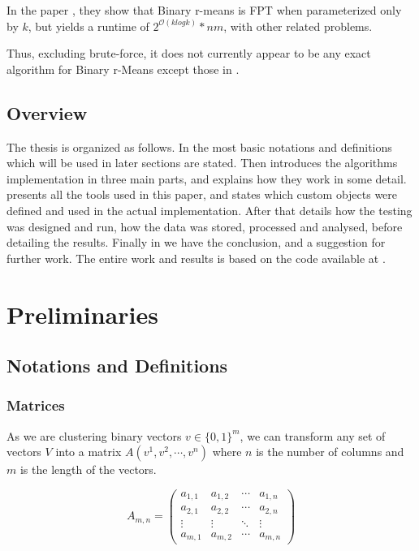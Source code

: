 \documentclass[a4paper]{article}
\begin{document}
In the paper \cite[Theorem 4]{fomin_golovach_panolan_2020}, they show that Binary r-means is FPT
when parameterized only by $k$, but yields a runtime of $2^{\mathcal{O}(k log k)}*nm$, with other related 
problems.

Thus, excluding brute-force, it does not currently appear to be any exact algorithm for 
Binary r-Means except those in \cite{fomin_golovach_panolan_2020}.

\subsection{Overview}
The thesis is organized as follows. In  the most basic notations and definitions which will be used in
later sections are stated. Then  introduces the algorithms implementation in three main parts, and
explains how they work in some detail.  presents all the tools used in this paper, and states which
custom objects were defined and used in the actual implementation. After that  details how the
testing was designed and run, how the data was stored, processed and analysed, before detailing the results. Finally
in  we have the conclusion, and a suggestion for further work. The entire work and results is 
based on the code available at \cite{github:codebase}.

%
%

\newpage

\section{Preliminaries}
\label{sec:prelim}
\subsection{Notations and Definitions}
\subsubsection{Matrices}
As we are clustering binary vectors $v \in \{0,1\}^m$, we can transform any set of vectors
$V$ into a matrix $A(v^1, v^2, \cdots, v^n)$ where $n$ is the number of columns
and $m$ is the length of the vectors.

\[
    A_{m,n} =
    \begin{pmatrix}
        a_{1,1} & a_{1,2} & \cdots & a_{1,n} \\
        a_{2,1} & a_{2,2} & \cdots & a_{2,n} \\
        \vdots  & \vdots  & \ddots & \vdots  \\
        a_{m,1} & a_{m,2} & \cdots & a_{m,n}
    \end{pmatrix}
\]
\end{document}
